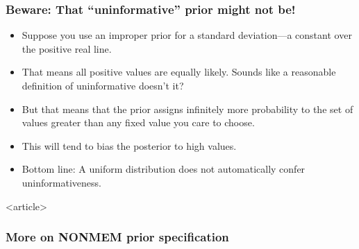 \documentclass{beamer}
\begin{document}
\begin{frame}
\frametitle{Beware: That ``uninformative'' prior might not be!}

\begin{itemize}
\item Suppose you use an improper prior for a standard deviation---a
  constant over the positive real line.
\item That means all positive values are equally likely. Sounds like a
  reasonable definition of uninformative doesn't it?
\item But that means that the prior assigns infinitely more
  probability to the set of values greater than any fixed value you care to
  choose.
\item This will tend to bias the posterior to high values.
\item Bottom line: A uniform distribution does not automatically
  confer uninformativeness.
\end{itemize}

\end{frame}

\begin{frame}<article>
  \frametitle{More on NONMEM prior specification}
  


\end{frame}





\end{document}
